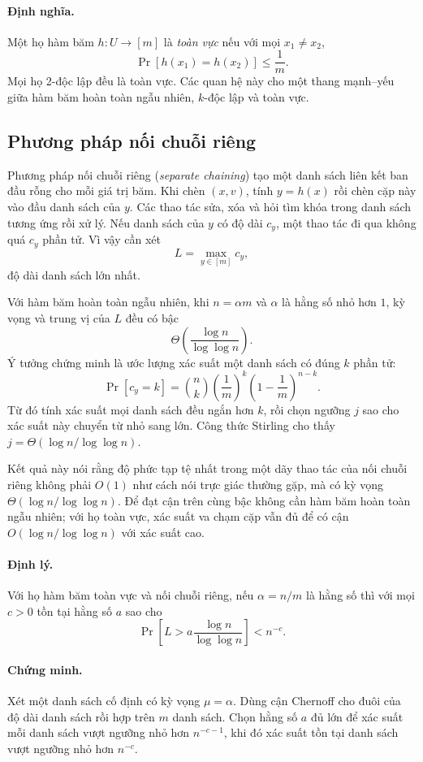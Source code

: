 \documentclass[11pt]{article}
\begin{document}
\paragraph{Định nghĩa.}
Một họ hàm băm $h:U\to[m]$ là \emph{toàn vực} nếu với mọi $x_1\ne x_2$,
\[
  \Pr[h(x_1)=h(x_2)]\le \frac1m.
\]
Mọi họ 2-độc lập đều là toàn vực. Các quan hệ này cho một thang mạnh--yếu giữa
hàm băm hoàn toàn ngẫu nhiên, $k$-độc lập và toàn vực.

\subsection{Phương pháp nối chuỗi riêng}

Phương pháp nối chuỗi riêng (\emph{separate chaining}) tạo một danh sách liên
kết ban đầu rỗng cho mỗi giá trị băm. Khi chèn $(x,v)$, tính $y=h(x)$ rồi chèn
cặp này vào đầu danh sách của $y$. Các thao tác sửa, xóa và hỏi tìm khóa trong
danh sách tương ứng rồi xử lý. Nếu danh sách của $y$ có độ dài $c_y$, một thao
tác đi qua không quá $c_y$ phần tử. Vì vậy cần xét
\[
  L=\max_{y\in[m]} c_y,
\]
độ dài danh sách lớn nhất.

Với hàm băm hoàn toàn ngẫu nhiên, khi $n=\alpha m$ và $\alpha$ là hằng số nhỏ
hơn $1$, kỳ vọng và trung vị của $L$ đều có bậc
\[
  \Theta\!\left(\frac{\log n}{\log\log n}\right).
\]
Ý tưởng chứng minh là ước lượng xác suất một danh sách có đúng $k$ phần tử:
\[
  \Pr[c_y=k]=\binom{n}{k}\left(\frac1m\right)^k
  \left(1-\frac1m\right)^{n-k}.
\]
Từ đó tính xác suất mọi danh sách đều ngắn hơn $k$, rồi chọn ngưỡng $j$ sao cho
xác suất này chuyển từ nhỏ sang lớn. Công thức Stirling cho thấy
$j=\Theta(\log n/\log\log n)$.

Kết quả này nói rằng độ phức tạp tệ nhất trong một dãy thao tác của nối chuỗi
riêng không phải $O(1)$ như cách nói trực giác thường gặp, mà có kỳ vọng
$\Theta(\log n/\log\log n)$. Để đạt cận trên cùng bậc không cần hàm băm hoàn
toàn ngẫu nhiên; với họ toàn vực, xác suất va chạm cặp vẫn đủ để có cận
$O(\log n/\log\log n)$ với xác suất cao.

\paragraph{Định lý.}
Với họ hàm băm toàn vực và nối chuỗi riêng, nếu $\alpha=n/m$ là hằng số thì với
mọi $c>0$ tồn tại hằng số $a$ sao cho
\[
  \Pr\!\left[L>a\frac{\log n}{\log\log n}\right]<n^{-c}.
\]

\paragraph{Chứng minh.}
Xét một danh sách cố định có kỳ vọng $\mu=\alpha$. Dùng cận Chernoff cho đuôi
của độ dài danh sách rồi hợp trên $m$ danh sách. Chọn hằng số $a$ đủ lớn để xác
suất mỗi danh sách vượt ngưỡng nhỏ hơn $n^{-c-1}$, khi đó xác suất tồn tại danh
sách vượt ngưỡng nhỏ hơn $n^{-c}$.
\end{document}
